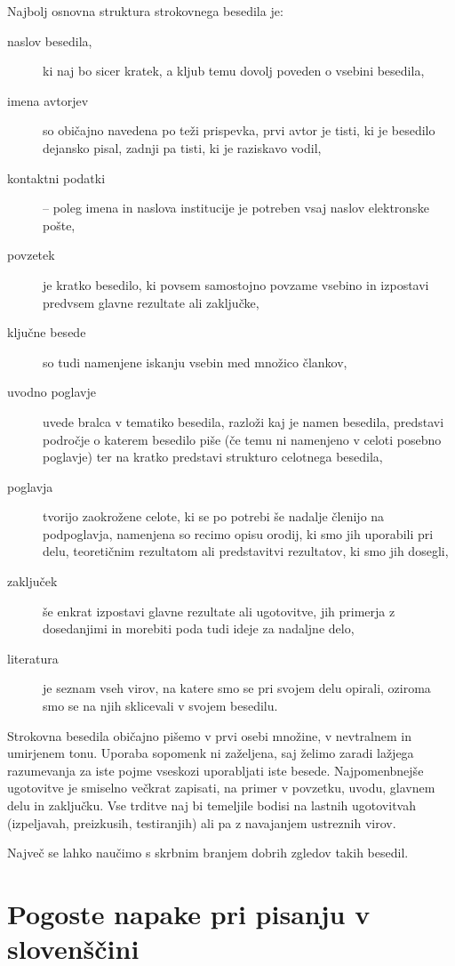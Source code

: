 \documentclass{feridiploma}
\begin{document}
	Najbolj osnovna struktura strokovnega besedila je:
	\begin{description}
	\item[naslov besedila,] ki naj bo sicer kratek, a kljub temu dovolj poveden o vsebini besedila,
	\item[imena avtorjev] so običajno navedena po teži prispevka, prvi avtor je tisti, ki je besedilo dejansko pisal, zadnji pa tisti, ki je raziskavo vodil,
	\item[kontaktni podatki] -- poleg imena in naslova institucije je potreben vsaj naslov elektronske pošte,
	\item[povzetek] je kratko besedilo, ki povsem samostojno povzame vsebino in izpostavi predvsem  glavne rezultate ali zaključke,
	\item[ključne besede] so tudi namenjene iskanju vsebin med množico člankov,
	\item[uvodno poglavje] uvede bralca v tematiko besedila, razloži kaj je namen besedila, predstavi področje o katerem besedilo piše 
	(če temu ni namenjeno v celoti posebno poglavje) ter na kratko predstavi strukturo celotnega besedila,
	\item[poglavja] tvorijo zaokrožene celote, ki se po potrebi še nadalje členijo na podpoglavja, namenjena so recimo opisu orodij, 
	ki smo jih uporabili pri delu, teoretičnim rezultatom ali predstavitvi rezultatov, ki smo jih dosegli,
	\item[zaključek] še enkrat izpostavi glavne rezultate ali ugotovitve, jih primerja z dosedanjimi in morebiti poda tudi ideje za nadaljne delo,
	\item[literatura] je seznam vseh virov, na katere smo se pri svojem delu opirali, oziroma smo se na njih sklicevali v svojem besedilu.
	\end{description}
	
	Strokovna besedila običajno pišemo v prvi osebi množine, v nevtralnem in umirjenem tonu. 
	Uporaba sopomenk ni zaželjena, saj želimo zaradi lažjega razumevanja za iste pojme vseskozi uporabljati iste besede.
	Najpomenbnejše ugotovitve je smiselno večkrat zapisati, na primer v povzetku, uvodu, glavnem delu in zaključku.
	Vse trditve naj bi temeljile bodisi na lastnih ugotovitvah (izpeljavah, preizkusih, testiranjih) ali pa z navajanjem ustreznih virov.
	
	Največ se lahko naučimo s skrbnim branjem dobrih zgledov takih besedil.
	
	\chapter{Pogoste napake pri pisanju v slovenščini}  %
	\label{slo}
	
\end{document}
